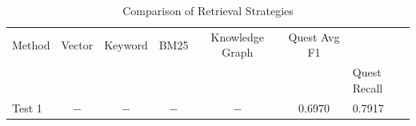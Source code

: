 
\begin{table}[h]
\centering
\caption{Comparison of Retrieval Strategies}
\label{tab:retrieval_comparison}
\begin{tabular}{lccccc}
\toprule
Method & Vector & Keyword & BM25 & Knowledge Graph & Quest Avg F1 \\ 
& & & & & & Quest Recall \\
\midrule
Test 1 & $-$ & $-$ & $-$ & $-$ & 0.6970 & 0.7917 \\
\bottomrule
\end{tabular}
\end{table}
